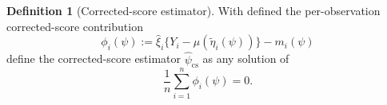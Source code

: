 \documentclass[11pt]{article}
\theoremstyle{definition}
\newtheorem{definition}{Definition}
\theoremstyle{remark}
\newcommand{\E}{\mathbb{E}}
\begin{document}
\begin{definition}[Corrected-score estimator]
With defined the per-observation corrected-score contribution
\begin{equation}
\phi_i(\psi):=\hat\xi_i\{Y_i-\mu(\tilde\eta_i(\psi))\}-m_i(\psi)
\label{eq:phi}
\end{equation}
define the corrected-score estimator $\hat\psi_{\mathrm{cs}}$ as any solution of
\begin{equation}
\frac{1}{n}\sum_{i=1}^n \phi_i(\psi)=0.
\label{eq:cs}
\end{equation}
\end{definition}




\end{document}
